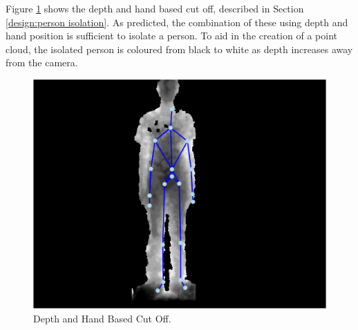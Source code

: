 Figure \ref{fig:depth and hand based cut off} shows the depth and hand based cut off, described in Section \ref{design:person isolation}. As predicted, the combination of these using depth and hand position is sufficient to isolate a person. To aid in the creation of a point cloud, the isolated person is coloured from black to white as depth increases away from the camera.\\

\begin{figure}[h]
\begin{center}
\includegraphics[scale=0.4]{./design/parse3} 
\end{center}
\caption{Depth and Hand Based Cut Off.}
\label{fig:depth and hand based cut off}
\end{figure} 